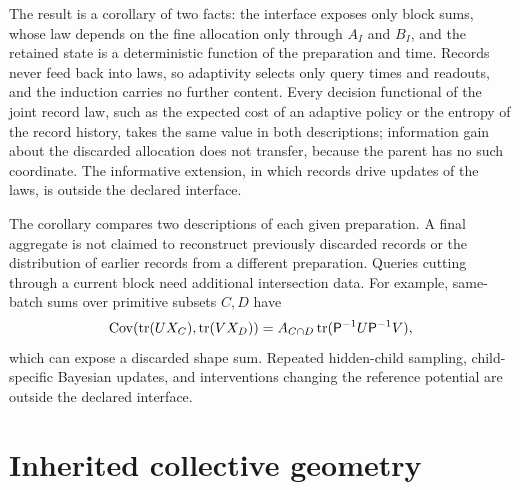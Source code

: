 The result is a corollary of two facts: the interface exposes only block sums, whose law depends on the fine allocation only through $A_I$ and $B_I$, and the retained state is a deterministic function of the preparation and time. Records never feed back into laws, so adaptivity selects only query times and readouts, and the induction carries no further content. Every decision functional of the joint record law, such as the expected cost of an adaptive policy or the entropy of the record history, takes the same value in both descriptions; information gain about the discarded allocation does not transfer, because the parent has no such coordinate. The informative extension, in which records drive updates of the laws, is outside the declared interface.

The corollary compares two descriptions of each given preparation. A final
aggregate is not claimed to reconstruct previously discarded records or the
distribution of earlier records from a different preparation. Queries cutting
through a current block need additional intersection data. For example,
same-batch sums over primitive subsets $C,D$ have
\begin{equation}
 \operatorname{Cov}(\operatorname{tr}(UX_C),\operatorname{tr}(VX_D))
 =A_{C\cap D}\operatorname{tr}(\mathsf P^{-1}U\mathsf P^{-1}V),
\end{equation}
which can expose a discarded shape sum. Repeated hidden-child sampling,
child-specific Bayesian updates, and interventions changing the reference
potential are outside the declared interface.

\section{Inherited collective geometry}

